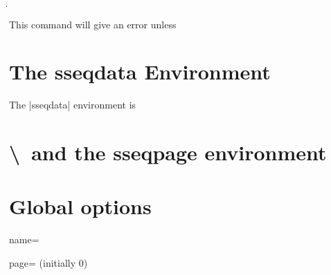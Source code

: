 \documentclass{ltxdoc}
\makeatletter
\def\sectionstring{\textbackslash\@xp\@gobble\string}
\makeatother
\begin{document}
\begin{sseqdata}[name=ex1,degree={#1}{1-#1}]
\begin{command}{\d{}}
\begin{codeexample}[]
\begin{sseqdata}[name=,degree={}{}]
\end{sseqdata}
\end{codeexample}
 This command will give an error unless


\end{command}

\begin{command}{\structline{}}

\end{command}

\section{The sseqdata Environment}
The |sseqdata| environment is


\section{\sectionstring\printpage\ and the sseqpage environment}





\section{Global options}
\begin{key}{name=}

\end{key}

\begin{key}{page= (initially 0)}

\end{key}


\end{sseqdata}
\end{document}
